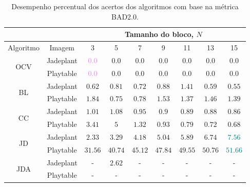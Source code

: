 \begin{table}[!ht]
    \centering
    \small
    \begin{tabular}{c|c|c|c|c|c|c|c|c}
        \cline{3-9}
        \multicolumn{2}{l}{} & \multicolumn{7}{c}{Tamanho do bloco, $N$} \\ \hline
        Algoritmo & Imagem & 3 & 5 & 7 & 9 & 11 & 13 & 15 \\ \hline
        \multirow{2}{*}{OCV} & Jadeplant & \textcolor{violet}{$0.0$} & $0.0$ & $0.0$ & $0.0$ & $0.0$ & $0.0$ & $0.0$ \\ \cline{2-9}
         & Playtable & \textcolor{violet}{$0.0$} & $0.0$ & $0.0$ & $0.0$ & $0.0$ & $0.0$ & $0.0$ \\ \hline
        \multirow{2}{*}{BL} & Jadeplant & $0.62$ & $0.81$ & $0.72$ & $0.88$ & $1.41$ & $0.59$ & $0.55$ \\ \cline{2-9}
         & Playtable & $1.84$ & $0.75$ & $0.78$ & $1.53$ & $1.37$ & $1.46$ & $1.39$ \\ \hline
        \multirow{2}{*}{CC} & Jadeplant & $1.01$ & $1.08$ & $0.95$ & $0.9$ & $0.89$ & $0.88$ & $0.86$ \\ \cline{2-9}
         & Playtable & $3.41$ & $5$ & $1.32$ & $0.93$ & $0.79$ & $0.72$ & $0.68$ \\ \hline
        \multirow{2}{*}{JD} & Jadeplant & $2.33$ & $3.29$ & $4.18$ & $5.04$ & $5.89$ & $6.74$ & \textcolor{teal}{$7.56$} \\ \cline{2-9}
         & Playtable & $31.56$ & $40.74$ & $45.12$ & $47.84$ & $49.55$ & $50.76$ & \textcolor{teal}{$51.66$} \\ \hline
        \multirow{2}{*}{JDA} & Jadeplant & - & $2.62$ & - & - & - & - & - \\ \cline{2-9}
         & Playtable & - & - & - & - & - & - & - \\ \hline
    \end{tabular}
    \caption{Desempenho percentual dos acertos dos algoritmos com base na métrica BAD2.0.}
    \label{tab:result_req1_perf}
\end{table}

